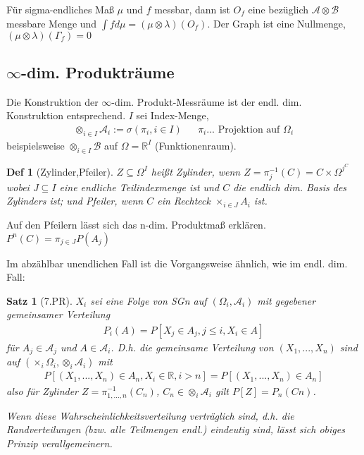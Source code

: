 \documentclass[]{article}
\newtheorem{theorem}{Satz}
\newtheorem*{definition*}{Def}
\begin{document}
Für sigma-endliches Maß $\mu$ und $f$ messbar, dann ist $O_f$ eine bezüglich $\mathcal{A}\otimes\mathcal{B}$ messbare Menge und $\int f d\mu = (\mu \otimes \lambda)(O_f)$. Der Graph ist eine Nullmenge, $(\mu \otimes \lambda)(\Gamma_f) =0$

\subsection{$\infty$-dim. Produkträume}
Die Konstruktion der $\infty$-dim. Produkt-Messräume ist der endl. dim. Konstruktion entsprechend. $I$ sei Index-Menge,
\begin{align*}
	\otimes_{i\in I}\mathcal{A}_i := \sigma(\pi_i, i\in I) && \pi_i ... \text{ Projektion auf } \Omega_i
\end{align*}
beispielsweise $\otimes_{i\in I}\mathcal{B}$ auf $\Omega=\mathbb{R}^I$ (Funktionenraum).

\begin{definition*}[Zylinder,Pfeiler]
	$Z \subseteq \Omega^I$ heißt Zylinder, wenn $Z=\pi_j^{-1}(C)=C\times\Omega^{j^C}$ wobei $J\subseteq I$ eine endliche Teilindexmenge ist und $C$ die endlich dim. Basis des Zylinders ist;
	und Pfeiler, wenn $C$ ein Rechteck $\times_{i \in J}A_i$ ist.
\end{definition*}

Auf den Pfeilern lässt sich das n-dim. Produktmaß erklären. $P^n(C)=\pi_{j\in J}P(A_j)$

Im abzählbar unendlichen Fall ist die Vorgangsweise ähnlich, wie im endl. dim. Fall:

\begin{theorem}[7.PR]
	$X_i$ sei eine Folge von SGn auf $(\Omega_i,\mathcal{A}_i)$ mit gegebener gemeinsamer Verteilung
	\begin{align*}
		P_i(A) = P[X_j\in A_j, j\leq i, X_i \in A]
	\end{align*}
	für $A_j\in\mathcal{A}_j$ und $A\in\mathcal{A}_i$. D.h. die gemeinsame Verteilung von $(X_1,...,X_n)$ sind auf $(\times_i\Omega_i, \otimes_i\mathcal{A}_i)$ mit
	\begin{align*}
		P[(X_1,...,X_n)\in A_n, X_i \in \mathbb{R}, i>n] = P[(X_1,...,X_n) \in A_n]
	\end{align*}
	also für Zylinder $Z = \pi_{1,...,n}^{-1}(C_n)$, $C_n \in \otimes_i\mathcal{A}_i$ gilt $P[Z]=P_n(Cn)$.
	
	Wenn diese Wahrscheinlichkeitsverteilung verträglich sind, d.h. die Randverteilungen (bzw. alle Teilmengen endl.) eindeutig sind, lässt sich obiges Prinzip verallgemeinern.
\end{theorem}
\end{document}
